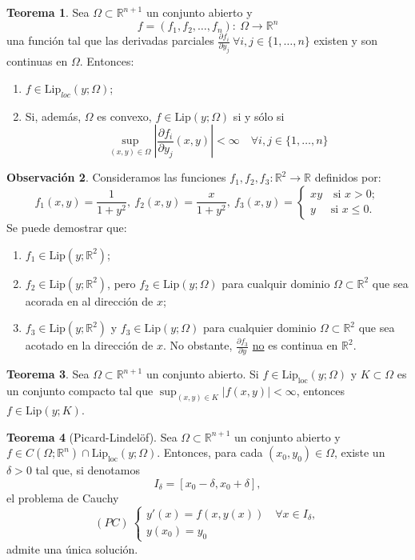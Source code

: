 \documentclass[11pt]{article}
\theoremstyle{definition} %
\newtheorem{theorem}{Teorema}[section]
\newtheorem{remark}[theorem]{Observación}
\newcommand{\R}{\mathbb{R}}
\begin{document}
\begin{theorem}
	Sea $\Omega\subset\R^{n+1}$ un conjunto abierto y
	\[ f = (f_1,f_2,\dots,f_n):\ \Omega \to \R^n \]
	\noindent una función tal que las derivadas parciales $\frac{\partial f_i}{\partial y_j}\ \forall i,j \in \{1,\dots,n\}$ existen y son continuas en $\Omega$. Entonces:
	\begin{enumerate}
		\item $f \in \text{Lip}_{\textit{loc}}(y;\Omega)$;

		\item Si, además, $\Omega$ es convexo, $f \in \text{Lip}(y;\Omega)$ si y sólo si
		\[ \sup_{(x,y)\in\Omega} \left| \frac{\partial f_i}{\partial y_j}(x,y) \right| < \infty \quad \forall i,j \in \{ 1,\dots, n \} \]
	\end{enumerate}
\end{theorem}

\begin{remark}
	Consideramos las funciones $f_1,f_2,f_3:\R^2 \to \R$ definidos por:
	\[ f_1(x,y)  = \frac{1}{1+y^2},\ f_2(x,y) = \frac{x}{1+y^2},\ f_3(x,y)= \begin{cases}
		xy \quad \text{si } x>0; \\
		y \quad \text{ si } x\leq 0.
	\end{cases} \]
	Se puede demostrar que:
	\begin{enumerate}
		\item $f_1 \in \text{Lip}(y;\R^2)$;
		
		\item $f_2 \in \text{Lip}(y;\R^2)$, pero $f_2 \in \text{Lip}(y;\Omega)$ para cualquir dominio $\Omega \subset \R^2$ que sea acorada en al dirección de $x$;

		\item $f_3 \in \text{Lip}(y;\R^2)$ y $f_3 \in \text{Lip}(y;\Omega)$ para cualquier dominio $\Omega \subset \R^2$ que sea acotado en la dirección de $x$. No obstante, $\frac{\partial f_3}{\partial y}$ \underline{no} es continua en $\R^2$.
	\end{enumerate}
\end{remark}

\begin{theorem}
	Sea $\Omega \subset \R^{n+1}$ un conjunto abierto. Si $f \in \text{Lip}_{\text{loc}}(y;\Omega)$ y $K \subset \Omega$ es un conjunto compacto tal que $\sup_{(x,y) \in K} |f(x,y)| < \infty$, entonces $f \in \text{Lip}(y;K)$.
\end{theorem}

\begin{theorem}[Picard-Lindelöf]
	Sea $\Omega \subset \R^{n+1}$ un conjunto abierto y $f\in C(\Omega; \R^n) \cap \text{Lip}_{\text{loc}}(y;\Omega)$. Entonces, para cada $(x_0,y_0) \in \Omega$, existe un $\delta > 0$ tal que, si denotamos
	\[ I_{\delta} = [x_0 - \delta, x_0 + \delta], \]
	\noindent el problema de Cauchy
	\[ (PC)\ \begin{cases}
		y'(x) = f(x,y(x))\quad \forall x \in I_{\delta}, \\
		y(x_0) = y_0
	\end{cases} \]
	\noindent admite una única solución.
\end{theorem}
\end{document}

